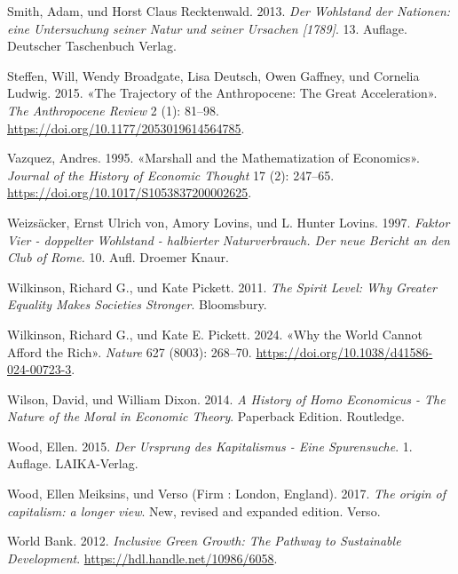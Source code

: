 \documentclass[
  nswissgerman,
  a4paper,
  DIV=11,
  numbers=noendperiod,
  oneside,
  openany]{scrreprt}
\newlength{\cslhangindent}
\newenvironment{CSLReferences}[2] %
 {\begin{list}{}{%
  \setlength{\itemindent}{0pt}
  \setlength{\leftmargin}{0pt}
  \setlength{\parsep}{0pt}
  \ifodd #1
   \setlength{\leftmargin}{\cslhangindent}
   \setlength{\itemindent}{-1\cslhangindent}
  \fi
  \setlength{\itemsep}{#2\baselineskip}}}
 {\end{list}}
\begin{document}
\begin{CSLReferences}{1}{1}
Smith, Adam, und Horst Claus Recktenwald. 2013. \emph{Der Wohlstand der
Nationen: eine Untersuchung seiner Natur und seiner Ursachen
{[}1789{]}}. 13. Auflage. Deutscher Taschenbuch Verlag.

Steffen, Will, Wendy Broadgate, Lisa Deutsch, Owen Gaffney, und Cornelia
Ludwig. 2015. {«The Trajectory of the Anthropocene: The Great
Acceleration»}. \emph{The Anthropocene Review} 2 (1): 81--98.
\url{https://doi.org/10.1177/2053019614564785}.

Vazquez, Andres. 1995. {«Marshall and the Mathematization of
Economics»}. \emph{Journal of the History of Economic Thought} 17 (2):
247--65. \url{https://doi.org/10.1017/S1053837200002625}.

Weizsäcker, Ernst Ulrich von, Amory Lovins, und L. Hunter Lovins. 1997.
\emph{Faktor Vier - doppelter Wohlstand - halbierter Naturverbrauch. Der
neue Bericht an den Club of Rome.} 10. Aufl. Droemer Knaur.

Wilkinson, Richard G., und Kate Pickett. 2011. \emph{The Spirit Level:
Why Greater Equality Makes Societies Stronger}. Bloomsbury.

Wilkinson, Richard G., und Kate E. Pickett. 2024. {«Why the World Cannot
Afford the Rich»}. \emph{Nature} 627 (8003): 268--70.
\url{https://doi.org/10.1038/d41586-024-00723-3}.

Wilson, David, und William Dixon. 2014. \emph{A History of Homo
Economicus - The Nature of the Moral in Economic Theory}. Paperback
Edition. Routledge.

Wood, Ellen. 2015. \emph{Der Ursprung des Kapitalismus - Eine
Spurensuche}. 1. Auflage. LAIKA-Verlag.

Wood, Ellen Meiksins, und Verso (Firm : London, England). 2017.
\emph{The origin of capitalism: a longer view}. New, revised and
expanded edition. Verso.

World Bank. 2012. \emph{Inclusive {Green} {Growth}: {The} {Pathway} to
{Sustainable} {Development}}. \url{https://hdl.handle.net/10986/6058}.

\end{CSLReferences}
\end{document}
